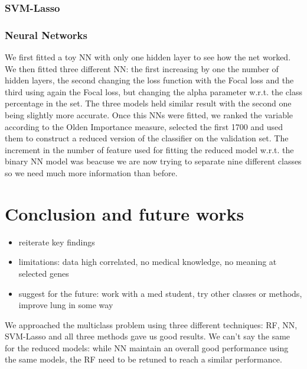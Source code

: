 \documentclass[a4paper,11pt, oneside]{article}  %
\begin{document}
\subsubsection{SVM-Lasso}

\subsubsection{Neural Networks}
We first fitted a toy NN with only one hidden layer to see how the net worked.
We then fitted three different NN: the first increasing by one the number of hidden layers, the second changing the loss function with the Focal loss and the third using again the Focal loss, but changing the alpha parameter w.r.t. the class percentage in the set.
The three models held similar result with the second one being slightly more accurate. Once this NNs were fitted, we ranked the variable according to the Olden Importance measure, selected the first 1700 and used them to construct a reduced version of the classifier on the validation set.
The increment in the number of feature used for fitting the reduced model w.r.t. the binary NN model was beacuse we are now trying to separate nine different classes so we need much more information than before.


\section{Conclusion and future works}
\begin{itemize}
	\item reiterate key findings
	\item limitations: data high correlated,  no medical knowledge,  no meaning at selected genes
	\item suggest for the future: work with a med student,  try other classes or methods,  improve lung in some way
\end{itemize}

We approached the multiclass problem using three different techniques: RF, NN, SVM-Lasso and all three methods gave us good results. We can't say the same for the reduced models: while NN maintain an overall good performance using the same models, the RF need to be retuned to reach a similar performance. 
\end{document}
